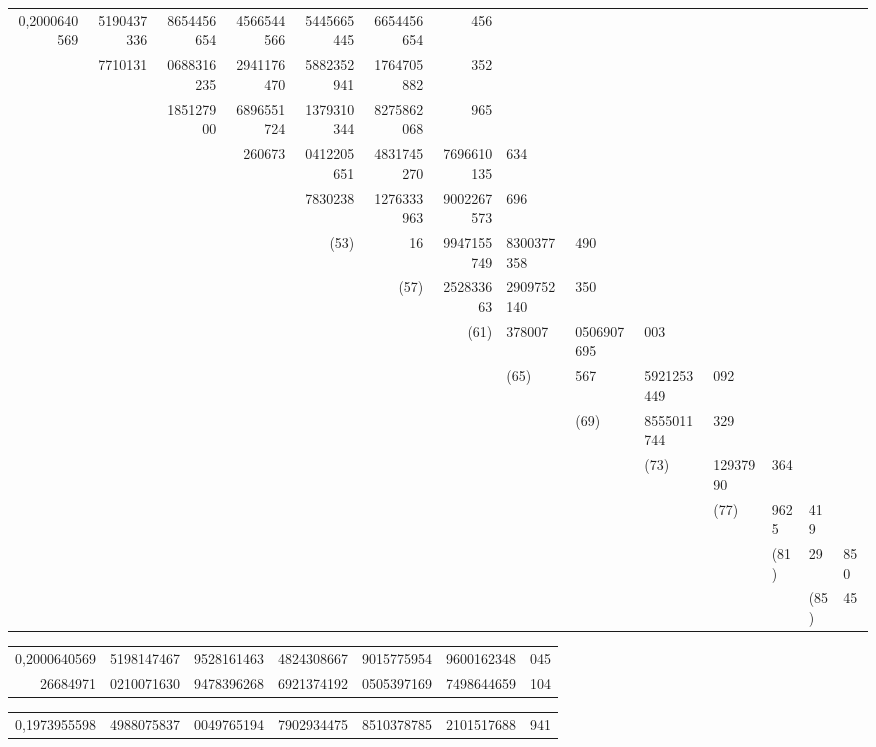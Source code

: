 \documentclass[10pt,a4paper]{article}
\begin{document}
\begin{center}
\begin{tabular}{r r r r r r r}
0,2000640569 & 5190437336 & 8654456654 & 4566544566 & 5445665445 & 6654456654 & 456 \\
& 7710131 & 0688316235 & 2941176470 & 5882352941 & 1764705882 & 352 \\
& & 185127900 & 6896551724 & 1379310344 & 8275862068 & 965 \\
& & & 260673 & 0412205651 & 4831745270 & 7696610135 & 634 \\
& & & & 7830238 & 1276333963 & 9002267573 & 696 \\
& & & & (53) & 16 & 9947155749 & 8300377358 & 490 \\
& & & & & (57) & 252833663 & 2909752140 & 350 \\
& & & & & & (61) & 378007 & 0506907695 & 003 \\
& & & & & & & (65) & 567 & 5921253449 & 092 \\
& & & & & & & & (69) & 8555011744 & 329 \\
& & & & & & & & & (73) & 12937990 & 364 \\
& & & & & & & & & & (77) & 9625 & 419 \\
& & & & & & & & & & & (81) & 29 & 850 \\
& & & & & & & & & & & & (85) & 45 \\
\end{tabular}
\end{center}

\medskip

\begin{center}
\begin{tabular}{r r r r r r r}
0,2000640569 & 5198147467 & 9528161463 & 4824308667 & 9015775954 & 9600162348 & 045 \\
26684971 & 0210071630 & 9478396268 & 6921374192 & 0505397169 & 7498644659 & 104 \\
\end{tabular}
\end{center}

\medskip

\begin{center}
\begin{tabular}{r r r r r r r}
0,1973955598 & 4988075837 & 0049765194 & 7902934475 & 8510378785 & 2101517688 & 941 \\
\end{tabular}
\end{center}

\newpage
\end{document}
